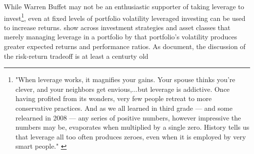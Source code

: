 \noindent %
While Warren Buffet may not be an enthusiastic supporter of taking leverage to invest\footnote{"When leverage works, it magnifies your gains. Your spouse thinks you're clever, and your neighbors get envious,...but leverage is addictive. Once having profited from its wonders, very few people retreat to more conservative practices. And as we all learned in third grade — and some relearned in 2008 — any series of positive numbers, however impressive the numbers may be, evaporates when multiplied by a single zero. History tells us that leverage all too often produces zeroes, even when it is employed by very smart people." \citep{noauthor_warren_nodate}}, 
even at fixed levels of portfolio volatility leveraged investing can be used to increase returns.
\citet{moreira_volatility-managed_2017} show across investment strategies and asset classes that merely managing leverage in a portfolio by that portfolio's volatility produces greater expected returns and performance ratios. As \citet{rutterford_financial_2016} document, the discussion of the risk-return tradeoff is at least a centurty old
